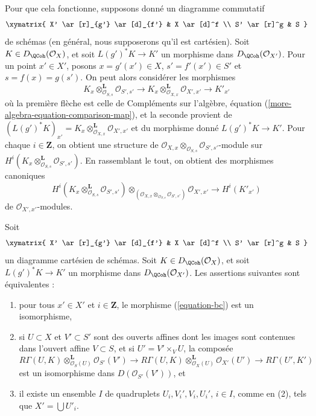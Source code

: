 \medskip\noindent
Pour que cela fonctionne, supposons donné un diagramme commutatif
$$
\xymatrix{
X' \ar[r]_{g'} \ar[d]_{f'} &
X \ar[d]^f \\
S' \ar[r]^g &
S
}
$$
de schémas (en général, nous supposerons qu'il est cartésien).
Soit $K \in D_\QCoh(\mathcal{O}_X)$,
et soit $L(g')^*K \to K'$ un morphisme dans $D_\QCoh(\mathcal{O}_{X'})$.
Pour un point $x' \in X'$, posons $x = g'(x') \in X$,
$s' = f'(x') \in S'$ et $s = f(x) = g(s')$.
On peut alors considérer les morphismes
$$
K_x \otimes_{\mathcal{O}_{S, s}}^\mathbf{L} \mathcal{O}_{S', s'} \to
K_x \otimes_{\mathcal{O}_{X, x}}^\mathbf{L} \mathcal{O}_{X', x'} \to
K'_{x'}
$$
où la première flèche est celle de Compléments sur l'algèbre,
équation (\ref{more-algebra-equation-comparison-map}),
et la seconde provient de
$(L(g')^*K)_{x'} =
K_x \otimes_{\mathcal{O}_{X, x}}^\mathbf{L} \mathcal{O}_{X', x'}$
et du morphisme donné $L(g')^*K \to K'$.
Pour chaque $i \in \mathbf{Z}$, on obtient une structure de
$\mathcal{O}_{X, x} \otimes_{\mathcal{O}_{S, s}} \mathcal{O}_{S', s'}$-module
sur
$H^i(K_x \otimes_{\mathcal{O}_{S, s}}^\mathbf{L} \mathcal{O}_{S', s'})$.
En rassemblant le tout, on obtient des morphismes canoniques
\begin{equation}
\label{equation-bc}
H^i(K_x \otimes_{\mathcal{O}_{S, s}}^\mathbf{L} \mathcal{O}_{S', s'})
\otimes_{(\mathcal{O}_{X, x} \otimes_{\mathcal{O}_{S, s}} \mathcal{O}_{S', s'})}
\mathcal{O}_{X', x'}
\longrightarrow
H^i(K'_{x'})
\end{equation}
de $\mathcal{O}_{X', x'}$-modules.

\begin{lemma}
\label{lemma-single-complex-base-change-condition}
Soit
$$
\xymatrix{
X' \ar[r]_{g'} \ar[d]_{f'} &
X \ar[d]^f \\
S' \ar[r]^g &
S
}
$$
un diagramme cartésien de schémas. Soit $K \in D_\QCoh(\mathcal{O}_X)$,
et soit $L(g')^*K \to K'$ un morphisme dans $D_\QCoh(\mathcal{O}_{X'})$.
Les assertions suivantes sont équivalentes :
\begin{enumerate}
\item pour tous $x' \in X'$ et $i \in \mathbf{Z}$, le morphisme (\ref{equation-bc})
est un isomorphisme,
\item si $U \subset X$ et $V' \subset S'$ sont des ouverts affines dont les images sont
contenues dans l'ouvert affine $V \subset S$, et si $U' = V' \times_V U$,
la composée
$$
R\Gamma(U, K) \otimes_{\mathcal{O}_S(U)}^\mathbf{L} \mathcal{O}_{S'}(V')
\to
R\Gamma(U, K) \otimes_{\mathcal{O}_X(U)}^\mathbf{L} \mathcal{O}_{X'}(U')
\to
R\Gamma(U', K')
$$
est un isomorphisme dans $D(\mathcal{O}_{S'}(V'))$, et
\item il existe un ensemble $I$ de quadruplets $U_i, V_i', V_i, U_i'$, $i \in I$,
comme en (2), tels que $X' = \bigcup U'_i$.
\end{enumerate}
\end{lemma}


